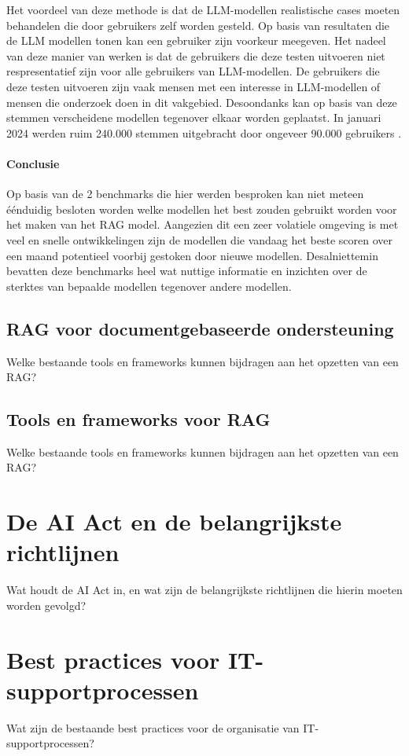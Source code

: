         Het voordeel van deze methode is dat de LLM-modellen realistische cases moeten behandelen die door gebruikers zelf worden gesteld. Op basis van resultaten die de LLM modellen tonen kan een gebruiker zijn voorkeur meegeven. Het nadeel van deze manier van werken is dat de gebruikers die deze testen uitvoeren niet respresentatief zijn voor alle gebruikers van LLM-modellen. De gebruikers die deze testen uitvoeren zijn vaak mensen met een interesse in LLM-modellen of mensen die onderzoek doen in dit vakgebied. Desoondanks kan op basis van deze stemmen verscheidene modellen tegenover elkaar worden geplaatst. In januari 2024 werden ruim 240.000 stemmen uitgebracht door ongeveer 90.000 gebruikers \autocite{Chiang2024}. 
        
        
        
        \paragraph{Conclusie}
        Op basis van de 2 benchmarks die hier werden besproken kan niet meteen éénduidig besloten worden welke modellen het best zouden gebruikt worden voor het maken van het RAG model. Aangezien dit een zeer volatiele omgeving is met veel en snelle ontwikkelingen zijn de modellen die vandaag het beste scoren over een maand potentieel voorbij gestoken door nieuwe modellen. Desalniettemin bevatten deze benchmarks heel wat nuttige informatie en inzichten over de sterktes van bepaalde modellen tegenover andere modellen. 
     
    \subsection{RAG voor documentgebaseerde ondersteuning}
    Welke bestaande tools en frameworks kunnen bijdragen aan het opzetten van een RAG?
    
    \subsection{Tools en frameworks voor RAG}
    Welke bestaande tools en frameworks kunnen bijdragen aan het opzetten van een RAG?

\section{De AI Act en de belangrijkste richtlijnen}
Wat houdt de AI Act in, en wat zijn de belangrijkste richtlijnen die hierin moeten worden gevolgd?

\section{Best practices voor IT-supportprocessen}
Wat zijn de bestaande best practices voor de organisatie van IT-supportprocessen?
